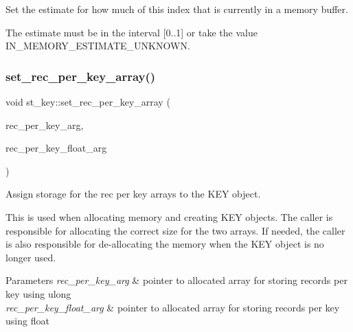 Set the estimate for how much of this index that is currently in a memory buffer.

The estimate must be in the interval \mbox{[}0..1\mbox{]} or take the value I\+N\+\_\+\+M\+E\+M\+O\+R\+Y\+\_\+\+E\+S\+T\+I\+M\+A\+T\+E\+\_\+\+U\+N\+K\+N\+O\+WN. \mbox{\label{structst__key_afc4c27a73647808d4bec5eb623882dbe}} 
\subsubsection{\texorpdfstring{set\+\_\+rec\+\_\+per\+\_\+key\+\_\+array()}{set\_rec\_per\_key\_array()}}
{\footnotesize\ttfamily void st\+\_\+key\+::set\+\_\+rec\+\_\+per\+\_\+key\+\_\+array (\begin{DoxyParamCaption}\item[{ulong $\ast$}]{rec\+\_\+per\+\_\+key\+\_\+arg,  }\item[{rec\+\_\+per\+\_\+key\+\_\+t $\ast$}]{rec\+\_\+per\+\_\+key\+\_\+float\+\_\+arg }\end{DoxyParamCaption})\hspace{0.3cm}{\ttfamily [inline]}}

Assign storage for the rec per key arrays to the K\+EY object.

This is used when allocating memory and creating K\+EY objects. The caller is responsible for allocating the correct size for the two arrays. If needed, the caller is also responsible for de-\/allocating the memory when the K\+EY object is no longer used.


\begin{DoxyParams}{Parameters}
{\em rec\+\_\+per\+\_\+key\+\_\+arg} & pointer to allocated array for storing records per key using ulong \\
\hline
{\em rec\+\_\+per\+\_\+key\+\_\+float\+\_\+arg} & pointer to allocated array for storing records per key using float \\
\hline
\end{DoxyParams}
\mbox{\label{structst__key_a5f3505facd17da0a896875df1b2fdb49}} 

